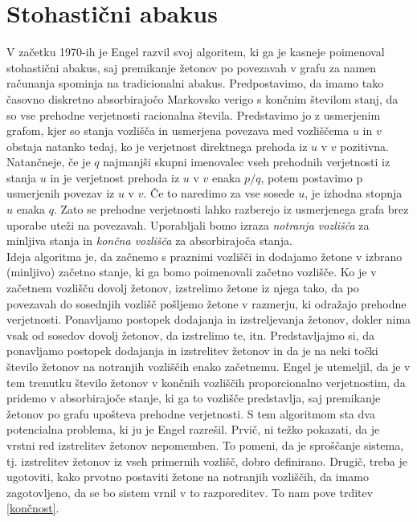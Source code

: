 \documentclass[twoside,11pt]{article}
\begin{document}
\section{Stohastični abakus}
V začetku 1970-ih je Engel razvil svoj algoritem, ki ga je kasneje poimenoval stohastični abakus, saj premikanje žetonov po povezavah v grafu za namen računanja spominja na tradicionalni abakus.
\indent Predpostavimo, da imamo tako časovno diskretno absorbirajočo Markovsko verigo s končnim številom stanj, da so vse prehodne verjetnosti racionalna števila. Predstavimo jo z usmerjenim grafom, kjer so stanja vozlišča in usmerjena povezava med vozliščema $u$ in $v$ obstaja natanko tedaj, ko je verjetnost direktnega prehoda iz $u$ v $v$ pozitivna. 
Natančneje, če je $q$ najmanjši skupni imenovalec vseh prehodnih verjetnosti iz stanja $u$ in je verjetnost prehoda iz $u$ v $v$ enaka $p/q$, potem postavimo p usmerjenih povezav iz $u$ v $v$. Če to naredimo za vse sosede $u$, je izhodna stopnja $u$ enaka $q$. Zato se prehodne verjetnosti lahko razberejo iz usmerjenega grafa brez uporabe uteži na povezavah. 
Uporabljali bomo izraza \emph{notranja vozlišča} za minljiva stanja in \emph{končna vozlišča} za absorbirajoča stanja. \\
\indent Ideja algoritma je, da začnemo s praznimi vozlišči in dodajamo žetone v izbrano (minljivo) začetno stanje, ki ga bomo poimenovali začetno vozlišče. Ko je v začetnem vozlišču dovolj žetonov, izstrelimo žetone iz njega tako, da po povezavah do sosednjih vozlišč pošljemo žetone v razmerju, ki odražajo prehodne verjetnosti. Ponavljamo postopek dodajanja in izstreljevanja žetonov, dokler nima vsak od sosedov dovolj žetonov, da izstrelimo te, itn. Predstavljajmo si, da ponavljamo postopek dodajanja in izstrelitev žetonov in
da je na neki točki število žetonov na notranjih vozliščih enako začetnemu. Engel je utemeljil, da je v tem trenutku število žetonov v končnih vozliščih proporcionalno verjetnostim, da pridemo v absorbirajoče stanje, ki ga to vozlišče predstavlja, saj premikanje žetonov po grafu upošteva prehodne verjetnosti. %
\newline 
\indent S tem algoritmom sta dva potencialna problema, ki ju je Engel razrešil. Prvič, ni težko pokazati, da je vrstni red izstrelitev žetonov nepomemben. To pomeni, da je sproščanje sistema, tj. izstrelitev žetonov iz vseh primernih vozlišč, dobro definirano. Drugič, treba je ugotoviti, kako prvotno postaviti žetone na notranjih vozliščih, da imamo zagotovljeno, da se bo sistem vrnil v to razporeditev. To nam pove trditev \ref{končnost}.  
\end{document}
